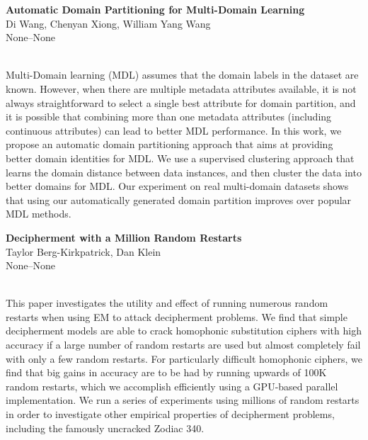 \documentclass[twoside,makeidx]{book}
\renewcommand{\normalsize}{\fontsize{8}{9}\selectfont}
\renewcommand{\small}{\fontsize{7}{8}\selectfont}
\begin{document}
\par\vspace{2em}\noindent%
\begin{minipage}{\linewidth}%
\begin{center}
\textbf{\normalsize Automatic Domain Partitioning for Multi-Domain Learning}\\
\normalsize  Di Wang,  Chenyan Xiong,  William Yang Wang\\
{\small None--None}\\
\end{center}
\end{minipage}\\[0.5em]
\nopagebreak%
\noindent%
{\small Multi-Domain learning (MDL) assumes that the domain labels in the dataset are known. However, when there are multiple metadata attributes available, it is not always straightforward to select a single best attribute for domain partition, and it is possible that combining more than one metadata attributes (including continuous attributes) can lead to better MDL performance. In this work, we propose an automatic domain partitioning approach that aims at providing better domain identities for MDL. We use a supervised clustering approach that learns the domain distance between data instances, and then cluster the data into better domains for MDL. Our experiment on real multi-domain datasets shows that using our automatically generated domain partition improves over popular MDL methods.}
\par\vspace{2em}\noindent%
\begin{minipage}{\linewidth}%
\begin{center}
\textbf{\normalsize Decipherment with a Million Random Restarts}\\
\normalsize  Taylor Berg-Kirkpatrick,  Dan Klein\\
{\small None--None}\\
\end{center}
\end{minipage}\\[0.5em]
\nopagebreak%
\noindent%
{\small This paper investigates the utility and effect of running numerous random restarts when using EM to attack decipherment problems. We find that simple decipherment models are able to crack homophonic substitution ciphers with high accuracy if a large number of random restarts are used but almost completely fail with only a few random restarts. For particularly difficult homophonic ciphers, we find that big gains in accuracy are to be had by running upwards of 100K random restarts, which we accomplish efficiently using a GPU-based parallel implementation. We run a series of experiments using millions of random restarts in order to investigate other empirical properties of decipherment problems, including the famously uncracked Zodiac 340.}
\end{document}
